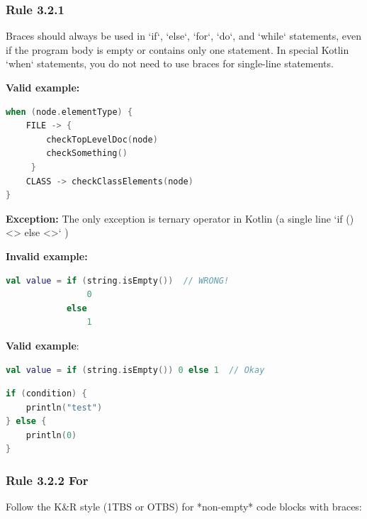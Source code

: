 \subsubsection*{\textbf{Rule 3.2.1}}
\leavevmode\newline



Braces should always be used in `if`, `else`, `for`, `do`, and `while` statements, even if the program body is empty or contains only one statement. In special Kotlin `when` statements, you do not need to use braces for single-line statements.



\textbf{Valid example:}



\begin{lstlisting}[language=Kotlin]
when (node.elementType) {
    FILE -> {
        checkTopLevelDoc(node)
        checkSomething()
     }
    CLASS -> checkClassElements(node)
}
\end{lstlisting}
\textbf{Exception:} The only exception is ternary operator in Kotlin (a single line `if () <> else <>` )



\textbf{Invalid example:}



\begin{lstlisting}[language=Kotlin]
val value = if (string.isEmpty())  // WRONG!
                0
            else
                1
\end{lstlisting}


\textbf{Valid example}:



\begin{lstlisting}[language=Kotlin]
val value = if (string.isEmpty()) 0 else 1  // Okay
\end{lstlisting}


\begin{lstlisting}[language=Kotlin]
if (condition) {
    println("test")
} else {
    println(0)
}
\end{lstlisting}


\subsubsection*{\textbf{Rule 3.2.2 For}}
\leavevmode\newline



Follow the K\&R style (1TBS or OTBS) for *non-empty* code blocks with braces:

